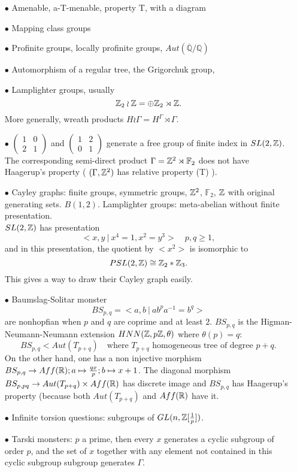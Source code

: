 \begin{itemize}
\item[$\bullet$] Amenable, a-T-menable, property T, with a diagram
\item[$\bullet$] Mapping class groups 
\item[$\bullet$] Profinite groups, locally profinite groups, $Aut(\overline{\mathbb Q} /\mathbb Q)$
\item[$\bullet$] Automorphism of a regular tree, the Grigorchuk group,
\item[$\bullet$] Lamplighter groups, usually 
\[\mathbb Z_2 \wr \mathbb Z = \oplus \mathbb Z_2 \rtimes \mathbb Z.\]
More generally, wreath products $ H\wr \Gamma = H^\Gamma\rtimes \Gamma$. 
\item[$\bullet$] $\begin{pmatrix}1 & 0 \\ 2 & 1\end{pmatrix}$ and $\begin{pmatrix}1 & 2 \\ 0 & 1\end{pmatrix}$ generate a free group of finite index in $SL(2,\mathbb Z)$. The corresponding semi-direct product $\Gamma = \mathbb Z^2\rtimes \mathbb F_2$ does not have Haagerup's property ( $(\Gamma, \mathbb Z^2)$ has relative property (T) ).\\

\item[$\bullet$] Cayley graphs: finite groups, symmetric groups, $\mathbb Z^2$, $\mathbb F_2$, $\mathbb Z$ with original generating sets. $B(1,2)$. Lamplighter groups: meta-abelian without finite presentation. \\

$SL(2,\mathbb Z)$ has presentation 
\[<x,y \ | \ x^4=1, x^2=y^3> \quad p,q \geq 1,\] 
and in this presentation, the quotient by $<x^2>$ is isomorphic to \[PSL(2,\mathbb Z)\cong \mathbb Z_2 \ast \mathbb Z_3.\] This gives a way to draw their Cayley graph easily.\\

\item[$\bullet$] Baumslag-Solitar monster
\[BS_{p,q} = <a,b \ | \ ab^p a^{-1} = b^q>\]
are nonhopfian when $p$ and $q$ are coprime and at least $2$. $BS_{p,q}$ is the Higman-Neumann-Neumann extension $HNN(\mathbb Z,p \mathbb Z, \theta)$ where $\theta(p)=q$: 
\[BS_{p,q} < Aut(T_{p+q}) \quad \text{where } T_{p+q}\text{ homogeneous tree of degree }p+q.\]
On the other hand, one has a non injective morphism $BS_{p,q}\rightarrow Aff(\mathbb R); a \mapsto \frac{qx}{p} ; b\mapsto x+1$. The diagonal morphism $BS_{p,pq} \rightarrow Aut(T_{p+q})\times Aff(\mathbb R)$ has discrete image and $BS_{p,q}$ has Haagerup's property (because both $Aut(T_{p+q})$ and $Aff(\mathbb R)$ have it.\\

\item[$\bullet$] Infinite torsion questions: subgroups of $GL(n, \mathbb Z[\frac{1}{p}])$.\\
\item[$\bullet$] Tarski monsters: $p$ a prime, then every $x$ generates a cyclic subgroup of order $p$, and the set of $x$ together with any element not contained in this cyclic subgroup subgroup generates $\Gamma$. 
\end{itemize}

